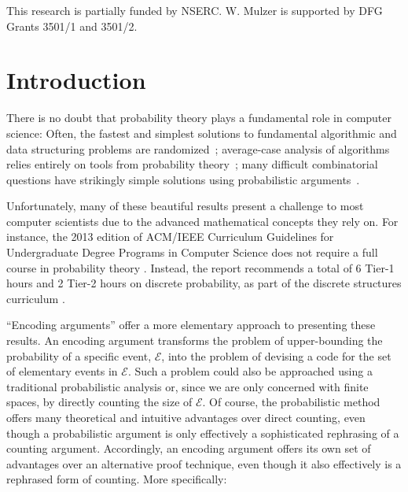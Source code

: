 \documentclass[prodmode,acmcsur]{acmsmall}
\begin{document}

\begin{bottomstuff}
This research is partially funded by NSERC.
W. Mulzer is supported by DFG Grants 3501/1 and 3501/2.
\end{bottomstuff}

\maketitle

\section{Introduction}

There is no doubt that probability theory plays a fundamental role in
computer science: Often, the fastest and simplest solutions to fundamental
algorithmic and data structuring problems are randomized~\cite{mitzenmacher.upfal:probability,motwani.raghavan:randomized}; 
average-case analysis of algorithms relies entirely on tools from probability 
theory~\cite{flajolet.sedgewick:aofa}; 
many difficult combinatorial questions have strikingly simple
solutions using probabilistic arguments~\cite{alon:probabilistic}.

Unfortunately, many of these beautiful results 
present a challenge to
most computer scientists due to
the advanced mathematical concepts they rely on.
For instance, the 2013 edition of ACM/IEEE Curriculum
Guidelines for Undergraduate Degree Programs in Computer Science does
not require a full course in probability theory
\cite[Page~50]{computing-curricula:computer}. Instead, the report
recommends a total of 6 Tier-1 hours and 2 Tier-2 hours on
discrete probability, as part of the discrete structures curriculum
\cite[Page~77]{computing-curricula:computer}.

``Encoding arguments'' offer a more elementary 
approach to presenting these results.
An encoding argument transforms the
problem of upper-bounding the probability of a specific event,
$\mathcal{E}$, into the problem of devising a code for the set of
elementary events in $\mathcal{E}$. Such a problem could also be
approached using a traditional probabilistic analysis or, since we are
only concerned with finite spaces, by directly counting the size of
$\mathcal{E}$. Of course, the probabilistic method offers many
theoretical and intuitive advantages over direct counting, even though
a probabilistic argument is only effectively a sophisticated
rephrasing of a counting argument. Accordingly, an encoding argument
offers its own set of advantages over an alternative proof technique,
even though it also effectively is a rephrased form of counting. More
specifically:
\end{document}

